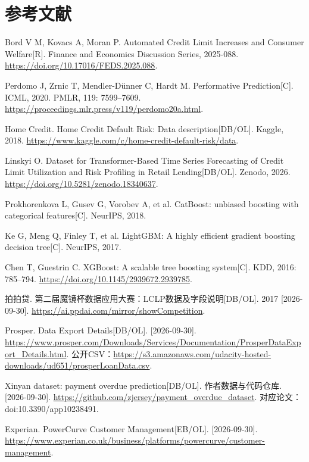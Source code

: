 \clearpage{}\section*{参考文献}
\begingroup\fontsize{9.5bp}{13bp}\selectfont
\begin{enumerate}[label={[\arabic*]},leftmargin=1.9em,itemsep=5bp,parsep=0pt]
\item Bord V M, Kovacs A, Moran P. Automated Credit Limit Increases and Consumer Welfare[R]. Finance and Economics Discussion Series, 2025-088. \url{https://doi.org/10.17016/FEDS.2025.088}.
\item Perdomo J, Zrnic T, Mendler-Dünner C, Hardt M. Performative Prediction[C]. ICML, 2020. PMLR, 119: 7599--7609. \url{https://proceedings.mlr.press/v119/perdomo20a.html}.
\item Home Credit. Home Credit Default Risk: Data description[DB/OL]. Kaggle, 2018. \url{https://www.kaggle.com/c/home-credit-default-risk/data}.
\item Linskyi O. Dataset for Transformer-Based Time Series Forecasting of Credit Limit Utilization and Risk Profiling in Retail Lending[DB/OL]. Zenodo, 2026. \url{https://doi.org/10.5281/zenodo.18340637}.
\item Prokhorenkova L, Gusev G, Vorobev A, et al. CatBoost: unbiased boosting with categorical features[C]. NeurIPS, 2018.
\item Ke G, Meng Q, Finley T, et al. LightGBM: A highly efficient gradient boosting decision tree[C]. NeurIPS, 2017.
\item Chen T, Guestrin C. XGBoost: A scalable tree boosting system[C]. KDD, 2016: 785--794. \url{https://doi.org/10.1145/2939672.2939785}.
\item 拍拍贷. 第二届魔镜杯数据应用大赛：LCLP数据及字段说明[DB/OL]. 2017 [2026-09-30]. \url{https://ai.ppdai.com/mirror/showCompetition}.
\item Prosper. Data Export Details[DB/OL]. [2026-09-30]. \url{https://www.prosper.com/Downloads/Services/Documentation/ProsperDataExport_Details.html}. 公开CSV：\url{https://s3.amazonaws.com/udacity-hosted-downloads/ud651/prosperLoanData.csv}.
\item Xinyan dataset: payment overdue prediction[DB/OL]. 作者数据与代码仓库. [2026-09-30]. \url{https://github.com/zjersey/payment_overdue_dataset}. 对应论文：doi:10.3390/app10238491.
\item Experian. PowerCurve Customer Management[EB/OL]. [2026-09-30]. \url{https://www.experian.co.uk/business/platforms/powercurve/customer-management}.

\end{enumerate}
